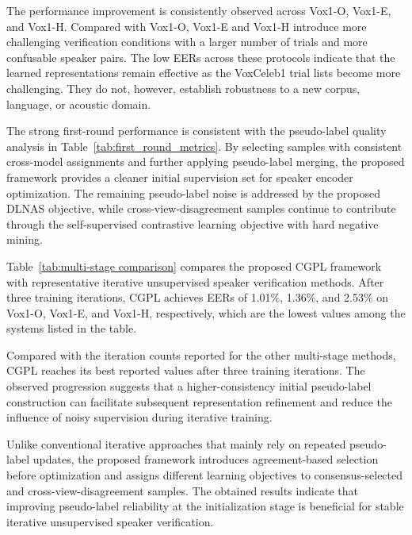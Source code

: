 \documentclass[journal]{IEEEtran}
\begin{document}
The performance improvement is consistently observed across Vox1-O,
Vox1-E, and Vox1-H.
Compared with Vox1-O, Vox1-E and Vox1-H introduce more challenging
verification conditions with a larger number of trials and more
confusable speaker pairs.
The low EERs across these protocols indicate that the learned
representations remain effective as the VoxCeleb1 trial lists become more
challenging. They do not, however, establish robustness to a new corpus,
language, or acoustic domain.

The strong first-round performance is consistent with the pseudo-label
quality analysis in Table~\ref{tab:first_round_metrics}.
By selecting samples with consistent cross-model assignments and further
applying pseudo-label merging, the proposed framework
provides a cleaner initial supervision set for speaker encoder
optimization.
The remaining pseudo-label noise is addressed by the proposed
DLNAS objective, while cross-view-disagreement samples continue to contribute through
the self-supervised contrastive learning objective with hard negative
mining.

Table~\ref{tab:multi-stage comparison} compares the proposed CGPL
framework with representative iterative unsupervised speaker
verification methods.
After three training iterations, CGPL achieves EERs of 1.01\%,
1.36\%, and 2.53\% on Vox1-O, Vox1-E, and Vox1-H, respectively,
which are the lowest values among the systems listed in the table.

Compared with the iteration counts reported for the other multi-stage
methods, CGPL reaches its best reported values after three training
iterations. The observed progression suggests that a higher-consistency initial pseudo-label
construction can facilitate subsequent representation refinement and
reduce the influence of noisy supervision during iterative training.

Unlike conventional iterative approaches that mainly rely on repeated
pseudo-label updates, the proposed framework introduces agreement-based
selection before optimization and assigns different learning
objectives to consensus-selected and cross-view-disagreement samples.
The obtained results indicate that improving pseudo-label reliability
at the initialization stage is beneficial for stable iterative
unsupervised speaker verification.
\end{document}

